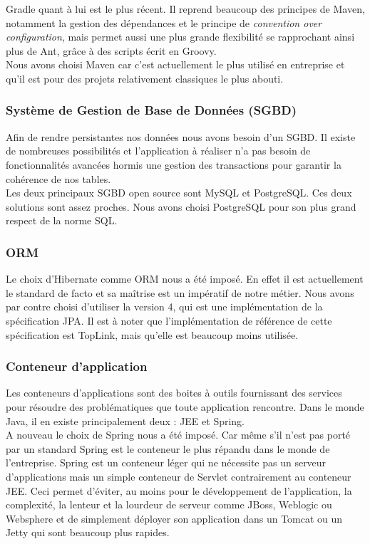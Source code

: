 Gradle quant à lui est le plus récent. Il reprend beaucoup des principes de Maven, notamment la gestion des dépendances et le principe de \textit{convention over configuration}, mais permet aussi une plus grande flexibilité se rapprochant ainsi plus de Ant, grâce à des scripts écrit en Groovy.\\

Nous avons choisi Maven car c'est actuellement le plus utilisé en entreprise et qu'il est pour des projets relativement classiques le plus abouti.

\subsubsection{Système de Gestion de Base de Données (SGBD)}

Afin de rendre persistantes nos données nous avons besoin d'un SGBD. Il existe de nombreuses possibilités et l'application à réaliser n'a pas besoin de fonctionnalités avancées hormis une gestion des transactions pour garantir la cohérence de nos tables.\\

Les deux principaux SGBD open source sont MySQL et PostgreSQL. Ces deux solutions sont assez proches. Nous avons choisi PostgreSQL pour son plus grand respect de la norme SQL.

\subsubsection{ORM}

Le choix d'Hibernate comme ORM nous a été imposé. En effet il est actuellement le standard de facto et sa maîtrise est un impératif de notre métier. Nous avons par contre choisi d'utiliser la version 4, qui est une implémentation de la spécification JPA. Il est à noter que l'implémentation de référence de cette spécification est TopLink, mais qu'elle est beaucoup moins utilisée. 

\subsubsection{Conteneur d'application}

Les conteneurs d'applications sont des boites à outils fournissant des services pour résoudre des problématiques que toute application rencontre. Dans le monde Java, il en existe principalement deux : JEE et Spring.\\

A nouveau le choix de Spring nous a été imposé. Car même s'il n'est pas porté par un standard Spring est le conteneur le plus répandu dans le monde de l'entreprise. Spring est un conteneur léger qui ne nécessite pas un serveur d'applications mais un simple conteneur de Servlet contrairement au conteneur JEE. Ceci permet d'éviter, au moins pour le développement de l'application, la complexité, la lenteur et la lourdeur de serveur comme JBoss, Weblogic ou Websphere et de simplement déployer son application dans un Tomcat ou un Jetty qui sont beaucoup plus rapides.\\

